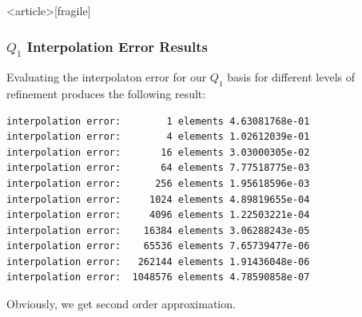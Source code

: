\begin{frame}<article>[fragile]
\frametitle{$Q_1$ Interpolation Error Results}
Evaluating the interpolaton error for our $Q_1$ basis for different
levels of refinement produces the following result:
\begin{lstlisting}[basicstyle=\scriptsize]
interpolation error:        1 elements 4.63081768e-01
interpolation error:        4 elements 1.02612039e-01
interpolation error:       16 elements 3.03000305e-02
interpolation error:       64 elements 7.77518775e-03
interpolation error:      256 elements 1.95618596e-03
interpolation error:     1024 elements 4.89819655e-04
interpolation error:     4096 elements 1.22503221e-04
interpolation error:    16384 elements 3.06288243e-05
interpolation error:    65536 elements 7.65739477e-06
interpolation error:   262144 elements 1.91436048e-06
interpolation error:  1048576 elements 4.78590858e-07
\end{lstlisting}
Obviously, we get second order approximation.
\end{frame}


%

